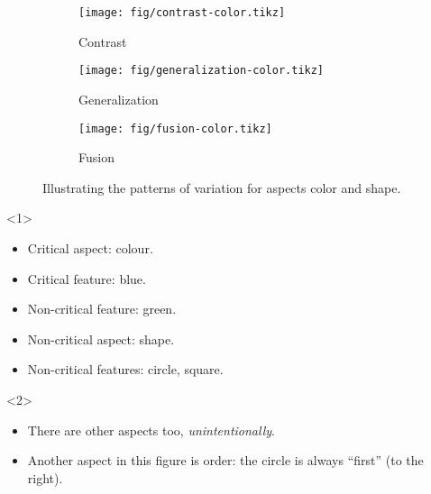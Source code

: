 \begin{frame}
  \begin{figure}
    \begin{subfigure}{0.3\columnwidth}
      \centering
      \texttt{[image: fig/contrast-color.tikz]}
      \caption{Contrast}
    \end{subfigure}
    \hfill
    \begin{subfigure}{0.3\columnwidth}
      \centering
      \texttt{[image: fig/generalization-color.tikz]}
      \caption{Generalization}
    \end{subfigure}
    \hfill
    \begin{subfigure}{0.3\columnwidth}
      \centering
      \texttt{[image: fig/fusion-color.tikz]}
      \caption{Fusion}
    \end{subfigure}
    \caption{%
      Illustrating the patterns of variation for aspects color and shape.
    }
  \end{figure}

  \begin{onlyenv}<1>
    \begin{example}
      \begin{itemize}
        \item Critical aspect: colour.
        \item Critical feature: blue.
        \item Non-critical feature: green.
        \item Non-critical aspect: shape.
        \item Non-critical features: circle, square.
      \end{itemize}
    \end{example}
  \end{onlyenv}
  \begin{onlyenv}<2>
    \begin{remark}
      \begin{itemize}
        \item There are other aspects too, \emph{unintentionally}.
        \item Another aspect in this figure is order: the circle is always 
          \enquote{first} (to the right).
      \end{itemize}
    \end{remark}
  \end{onlyenv}
\end{frame}

